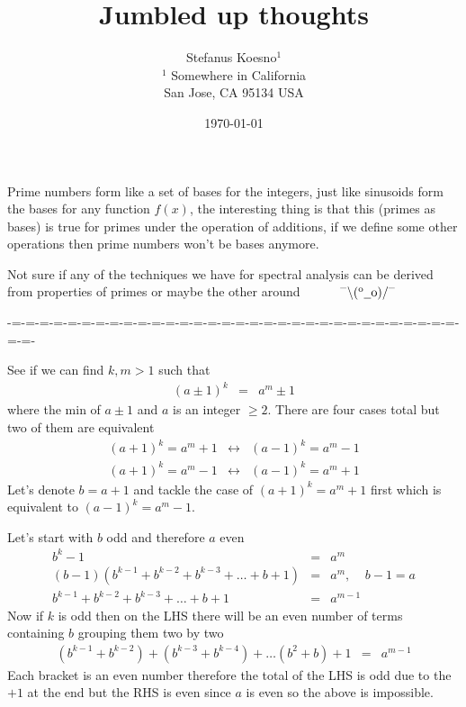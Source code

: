 \documentclass[aps,preprint,preprintnumbers,nofootinbib,showpacs,prd]{revtex4-1}
\newcommand{\nbea}{\begin{eqnarray*}}
\newcommand{\neea}{\end{eqnarray*}}
\newcommand{\dunno}{$ {}^{\mbox {--}}\backslash(^{\rm o}{}\underline{\hspace{0.2cm}}{\rm o})/^{\mbox {--}}$}
\begin{document}
\title{Jumbled up thoughts}
\bigskip
\author{Stefanus Koesno$^1$\\
$^1$ Somewhere in California\\ San Jose, CA 95134 USA\\
}
%
\date{\today}
%
\begin{abstract}

\end{abstract}
%
\maketitle

\renewcommand{\theequation}{A.\arabic{equation}}  %
\setcounter{equation}{0}  %


Prime numbers form like a set of bases for the integers, just like sinusoids form the bases for any function $f(x)$, the interesting thing is that this (primes as bases) is true for primes under the operation of additions, if we define some other operations then prime numbers won't be bases anymore.

Not sure if any of the techniques we have for spectral analysis can be derived from properties of primes or maybe the other around ~~~~~ \dunno

-=-=-=-=-=-=-=-=-=-=-=-=-=-=-=-=-=-=-=-=-=-=-=-=-=-=-=-=-=-=-=-=-=-=-


See if we can find $k,m > 1$ such that
%
\nbea
(a\pm1)^k & = & a^m \pm 1
\neea
%
where the min of $a \pm 1$ and $a$ is an integer $\ge 2$. There are four cases total but two of them are equivalent
%
\nbea
(a + 1)^k = a^m + 1 & \longleftrightarrow & (a - 1)^k = a^m - 1 \\
(a + 1)^k = a^m - 1 & \longleftrightarrow & (a - 1)^k = a^m + 1
\neea
%
Let's denote $b = a + 1$ and tackle the case of $(a+1)^k = a^m + 1$ first which is equivalent to $(a - 1)^k = a^m - 1$.

Let's start with $b$ odd and therefore $a$ even
%
\nbea
b^k - 1 & = & a^m \\
(b-1)(b^{k-1} + b^{k-2} + b^{k-3} + \dots + b + 1) & = & a^m, ~~~~~ b-1 = a \\
b^{k-1} + b^{k-2} + b^{k-3} + \dots + b + 1 & = & a^{m-1}
\neea
%
Now if $k$ is odd then on the LHS there will be an even number of terms containing $b$ grouping them two by two
%
\nbea
(b^{k-1} + b^{k-2}) + (b^{k-3} + b^{k-4}) + \dots ( b^2+ b) + 1 & = & a^{m-1}
\neea
%
Each bracket is an even number therefore the total of the LHS is odd due to the $+1$ at the end but the RHS is even since $a$ is even so the above is impossible.
\end{document}
